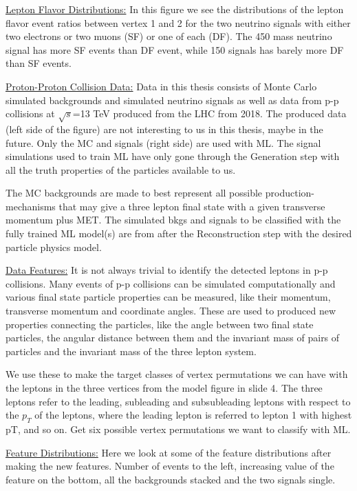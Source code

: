 \documentclass[a4paper, american, 12pt]{report}
\begin{document}
	\underline{Lepton Flavor Distributions:}
	In this figure we see the distributions of the lepton flavor event ratios between vertex 1 and 2 for the two neutrino signals with either two electrons or two muons (SF) or one of each (DF). The 450 mass neutrino signal has more SF events than DF event, while 150 signals has barely more DF than SF events.
	
	
	\underline{Proton-Proton Collision Data:}
	Data in this thesis consists of Monte Carlo simulated backgrounds and simulated neutrino signals as well as data from p-p collisions at $\sqrt{s}$=13 TeV produced from the LHC from 2018. The produced data (left side of the figure) are not interesting to us in this thesis, maybe in the future. Only the MC and signals (right side) are used with ML. The signal simulations used to train ML have only gone through the Generation step with all the truth properties of the particles available to us. 
	
	The MC backgrounds are made to best represent all possible production-mechanisms that may give a three lepton final state with a given transverse momentum plus MET. The simulated bkgs and signals to be classified with the fully trained ML model(s) are from after the Reconstruction step with the desired particle physics model.
	
	
	\underline{Data Features:}
	It is not always trivial to identify the detected leptons in p-p collisions. Many events of p-p collisions can be simulated computationally and various final state particle properties can be measured, like their momentum, transverse momentum and coordinate angles. These are used to produced new properties connecting the particles, like the angle between two final state particles, the angular distance between them and the invariant mass of pairs of particles and the invariant mass of the three lepton system.
	
	We use these to make the target classes of vertex permutations we can have with the leptons in the three vertices from the model figure in slide 4. The three leptons refer to the leading, subleading and subsubleading leptons with respect to the $p_T$ of the leptons, where the leading lepton is referred to lepton 1 with highest pT, and so on. Get six possible vertex permutations we want to classify with ML.
	
	
	\underline{Feature Distributions:}
	Here we look at some of the feature distributions after making the new features. Number of events to the left, increasing value of the feature on the bottom, all the backgrounds stacked and the two signals single.
	
\end{document}
